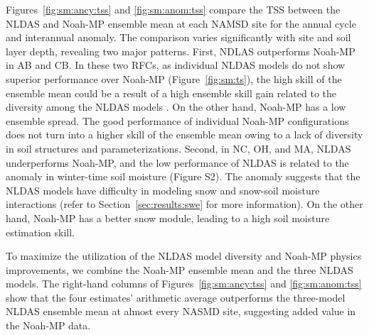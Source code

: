 \documentclass[essd, manuscript]{copernicus}
\begin{document}
Figures~\ref{fig:sm:ancy:tss} and \ref{fig:sm:anom:tss} compare the TSS between the NLDAS and Noah-MP ensemble mean at each NAMSD site for the annual cycle and interannual anomaly. The comparison varies significantly with site and soil layer depth, revealing two major patterns. First, NDLAS outperforms Noah-MP in AB and CB. In these two RFCs, as individual NLDAS models do not show superior performance over Noah-MP (Figure~\ref{fig:sm:ts}), the high skill of the ensemble mean could be a result of a high ensemble skill gain \citep{fei2021WRR} related to the diversity among the NLDAS models \citep{guo2007QJRMS, xia2015JHa}. On the other hand, Noah-MP has a low ensemble spread. The good performance of individual Noah-MP configurations does not turn into a higher skill of the ensemble mean owing to a lack of diversity in soil structures and parameterizations. Second, in NC, OH, and MA, NLDAS underperforms Noah-MP, and the low performance of NLDAS is related to the anomaly in winter-time soil moisture (Figure S2). The anomaly suggests that the NLDAS models have difficulty in modeling snow and snow-soil moisture interactions (refer to Section~\ref{sec:results:swe} for more information). On the other hand, Noah-MP has a better snow module, leading to a high soil moisture estimation skill.

To maximize the utilization of the NLDAS model diversity and Noah-MP physics improvements, we combine the Noah-MP ensemble mean and the three NLDAS models. The right-hand columns of Figures~\ref{fig:sm:ancy:tss} and \ref{fig:sm:anom:tss} show that the four estimates' arithmetic average outperforms the three-model NLDAS ensemble mean at almost every NASMD site, suggesting added value in the Noah-MP data.
\end{document}
